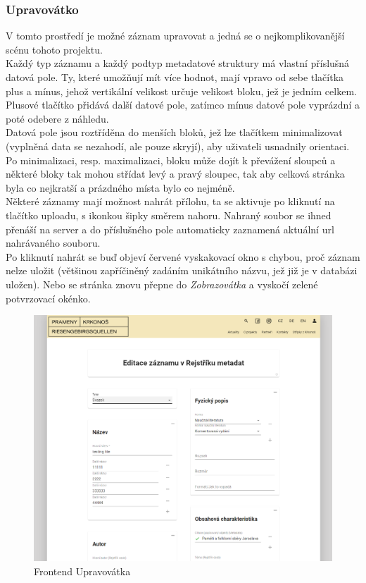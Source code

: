 \subsubsection{Upravovátko}
V tomto prostředí je možné záznam upravovat a jedná se o nejkomplikovanější scénu tohoto projektu.\\
Každý typ záznamu a každý podtyp metadatové struktury má vlastní příslušná datová pole.
Ty, které umožňují mít více hodnot, mají vpravo od sebe tlačítka plus a mínus,
jehož vertikální velikost určuje velikost bloku, jež je jedním celkem. Plusové tlačítko přidává
další datové pole, zatímco mínus datové pole vyprázdní a poté odebere z náhledu.
\\
Datová pole jsou roztříděna do menších bloků, jež lze tlačítkem minimalizovat
(vyplněná data se nezahodí, ale pouze skryjí), aby uživateli usnadnily orientaci.
Po minimalizaci, resp. maximalizaci, bloku může dojít k převážení
sloupců a některé bloky tak mohou střídat levý a pravý sloupec, tak aby celková stránka byla co nejkratší
a prázdného místa bylo co nejméně.\\
Některé záznamy mají možnost nahrát přílohu, ta se aktivuje po kliknutí na tlačítko uploadu, s ikonkou šipky
směrem nahoru. Nahraný soubor se ihned přenáší na server a do příslušného pole automaticky 
zaznamená aktuální url nahrávaného souboru.\\
Po kliknutí nahrát se buď objeví červené vyskakovací okno s chybou, proč záznam nelze uložit
(většinou zapříčiněný zadáním unikátního názvu, jež již je v databázi uložen).
Nebo se stránka znovu přepne do \textit{Zobrazovátka} a vyskočí zelené potvrzovací okénko.
\begin{figure}[H]
	\centering
	\includegraphics[width=.8\linewidth]{img/editScene.png}
	\caption{Frontend Upravovátka}
\end{figure}


